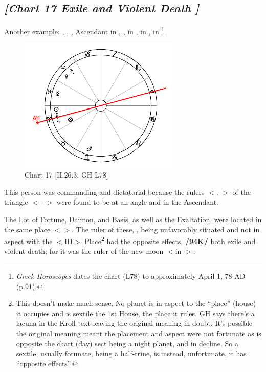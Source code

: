 \subsection*{\textit{[Chart 17 Exile and Violent Death ]}}

Another example: \Sun, \Moon, \Jupiter, Ascendant in \Aries, \Saturn, \Venus in \Aquarius, \Mars\xspace in \Gemini, \Mercury\xspace in \Pisces
\footnote{\textit{Greek Horoscopes} dates the chart (L78) to approximately April 1, 78 AD (p.91).}

\clearpage
\begin{figure}
\centering
\vspace{-20pt}
\includegraphics[width=0.68\textwidth]{charts/2_26_3}
\caption{Chart 17 [II.26.3, GH L78]}
\label{fig:chart17}
\end{figure}

This person was commanding and dictatorial because the rulers $<$\Sun, \Jupiter$>$ of the triangle $<$\Leo-\Sagittarius-\Aries$>$ were found to be at an angle and in the Ascendant. 

The Lot of Fortune, Daimon, and Basis, as well as the Exaltation, were located in the same place $<$\Aries$>$. The ruler of these, \Mars, being unfavorably situated and not in aspect with the $<$III$>$ Place\footnote{This doesn't make much sense. No planet is in aspect to the ``place'' (house) it occupies and \Mars\xspace is sextile the 1st House, the place it rules. GH says there's a lacuna in the Kroll text leaving the original meaning in doubt. It's possible the original meaning meant the placement and aspect were not fortunate as \Mars\xspace is opposite the chart (day) sect being a night planet, and in decline. So a sextile, usually fotunate, being a half-trine, is instead, unfortunate, it has ``opposite effects''.} had the opposite effects,
\textbf{/94K/} both exile and violent death; for it was the ruler of the new moon $<$in \Aries$>$.

